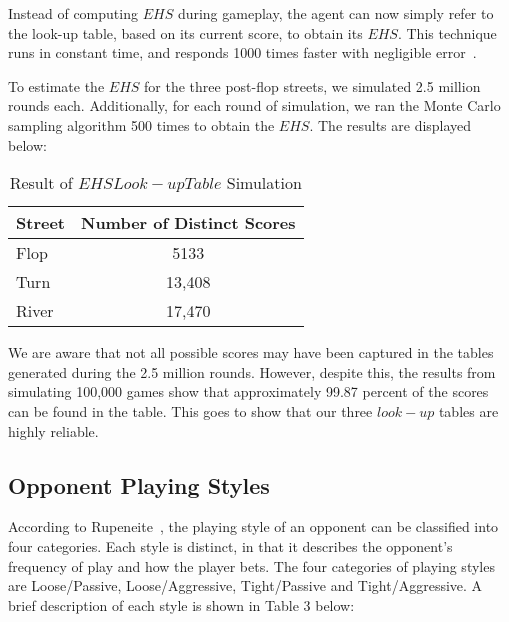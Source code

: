\documentclass{article}
\begin{document}
Instead of computing $EHS$ during gameplay, the agent can now simply refer to the look-up table, based on its current score, to obtain its $EHS$. This technique runs in constant time, and responds 1000 times faster with negligible error~\cite{trc:ars}.

To estimate the $EHS$ for the three post-flop streets, we simulated 2.5 million rounds each. Additionally, for each round of simulation, we ran the Monte Carlo sampling algorithm 500 times to obtain the $EHS$. The results are displayed below:

\begin{table}[h!]
  \begin{center}
    \begin{tabular}{l|c}
      \textbf{Street} & \textbf{Number of Distinct Scores} \\
      \hline
      Flop & 5133 \\
      Turn & 13,408 \\
      River & 17,470 \\
    \end{tabular}
    \caption{Result of $EHS Look-up Table$ Simulation}
    \label{tab:table2}
  \end{center}
\end{table}

\noindent We are aware that not all possible scores may have been captured in the tables generated during the 2.5 million rounds. However, despite this, the results from simulating 100,000 games show that approximately 99.87 percent of the scores can be found in the table. This goes to show that our three $look-up$ tables are highly reliable.

\subsection{Opponent Playing Styles}

According to Rupeneite~, the playing style of an opponent can be classified into four categories. Each style is distinct, in that it describes the opponent's frequency of play and how the player bets. The four categories of playing styles are Loose/Passive, Loose/Aggressive, Tight/Passive and Tight/Aggressive. A brief description of each style is shown in Table 3 below:
\end{document}
